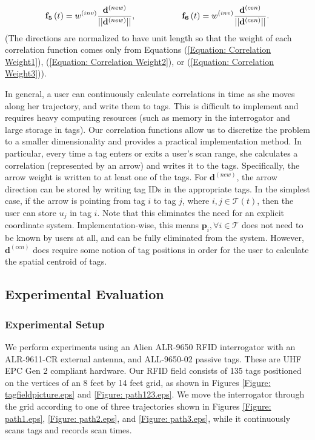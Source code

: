 \begin{eqnarray}
\mathbf{f_5}\left(t\right) = w^{\left(inv\right)} \frac{\mathbf{d}^{\left(new\right)}}{|| \mathbf{d}^{\left(new\right)}  ||}, 
\hspace{0.75in} 
\mathbf{f_6}\left(t\right) = w^{\left(inv\right)} \frac{\mathbf{d}^{\left(cen\right)}}{|| \mathbf{d}^{\left(cen\right)}  ||}.
\end{eqnarray}
(The directions are normalized to have unit length so that the weight of each correlation function comes only from Equations (\ref{Equation: Correlation Weight1}), (\ref{Equation: Correlation Weight2}), or (\ref{Equation: Correlation Weight3})).

In general, a user can continuously calculate correlations in time as she moves along her trajectory, and write them to tags.  This is difficult to implement and requires heavy computing resources (such as memory in the interrogator and large storage in tags).  Our correlation functions allow us to discretize the problem to a smaller dimensionality and provides a practical implementation method.  In particular, every time a tag enters or exits a user's scan range, she calculates a correlation (represented by an arrow) and writes it to the tags.  Specifically, the arrow weight is written to at least one of the tags.  For $\mathbf{d}^{\left(new\right)}$, the arrow direction can be stored by writing tag IDs in the appropriate tags.  In the simplest case, if the arrow is pointing from tag $i$ to tag $j$, where $i, j \in \mathcal{T}\left(t\right)$, then the user can store $u_j$ in tag $i$.  Note that this eliminates the need for an explicit coordinate system.  Implementation-wise, this means $\mathbf{p}_i, \forall i \in \mathcal{T}$ does not need to be known by users at all, and can be fully eliminated from the system.  However, $\mathbf{d}^{\left(cen\right)}$ does require some notion of tag positions in order for the user to calculate the spatial centroid of tags.

\subsection{Experimental Evaluation}
\label{Section: Tracking Protocols: Space-time Correlations: Experimental Evaluation}
\subsubsection{\textbf{Experimental Setup}}
We perform experiments using an Alien ALR-9650 RFID interrogator \cite{Alien Reader} with an ALR-9611-CR external antenna, and ALL-9650-02 passive tags. These are UHF EPC Gen 2 compliant hardware.  Our RFID field consists of 135 tags positioned on the vertices of an 8 feet by 14 feet grid, as shown in Figures \ref{Figure: tagfieldpicture.eps} and \ref{Figure: path123.eps}. We move the interrogator through the grid according to one of three trajectories shown in Figures \ref{Figure: path1.eps}, \ref{Figure: path2.eps}, and \ref{Figure: path3.eps}, while it continuously scans tags and records scan times. 

